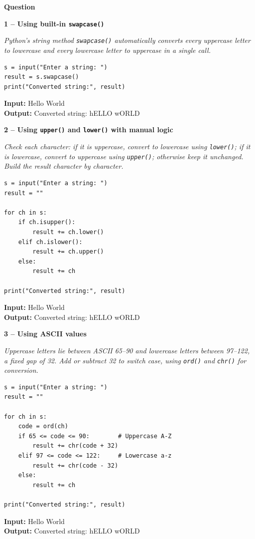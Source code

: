 \documentclass[12pt]{article}
\newenvironment{qbox}[1]{\par\bigskip\noindent\textbf{#1}\par}{\par\medskip}
\newcommand{\1}{Question}
\newcommand{\method}[1]{\par\medskip\noindent\textbf{#1}\par}
\newcommand{\logicbox}[1]{\par\smallskip\noindent\textit{#1}\par}
\newcommand{\inout}[2]{\par\smallskip\noindent\textbf{Input:} #1\\\textbf{Output:} #2\par}
\begin{document}
\begin{qbox}{\1}

\method{1 -- Using built-in \texttt{swapcase()}}
\logicbox{Python's string method \texttt{swapcase()} automatically converts every uppercase letter to lowercase and every lowercase letter to uppercase in a single call.}
\begin{lstlisting}
s = input("Enter a string: ")
result = s.swapcase()
print("Converted string:", result)
\end{lstlisting}
\inout{Hello World}{Converted string: hELLO wORLD}

\method{2 -- Using \texttt{upper()} and \texttt{lower()} with manual logic}
\logicbox{Check each character: if it is uppercase, convert to lowercase using \texttt{lower()}; if it is lowercase, convert to uppercase using \texttt{upper()}; otherwise keep it unchanged. Build the result character by character.}
\begin{lstlisting}
s = input("Enter a string: ")
result = ""

for ch in s:
    if ch.isupper():
        result += ch.lower()
    elif ch.islower():
        result += ch.upper()
    else:
        result += ch

print("Converted string:", result)
\end{lstlisting}
\inout{Hello World}{Converted string: hELLO wORLD}

\method{3 -- Using ASCII values}
\logicbox{Uppercase letters lie between ASCII 65--90 and lowercase letters between 97--122, a fixed gap of 32. Add or subtract 32 to switch case, using \texttt{ord()} and \texttt{chr()} for conversion.}
\begin{lstlisting}
s = input("Enter a string: ")
result = ""

for ch in s:
    code = ord(ch)
    if 65 <= code <= 90:        # Uppercase A-Z
        result += chr(code + 32)
    elif 97 <= code <= 122:     # Lowercase a-z
        result += chr(code - 32)
    else:
        result += ch

print("Converted string:", result)
\end{lstlisting}
\inout{Hello World}{Converted string: hELLO wORLD}
\end{qbox}
\end{document}
